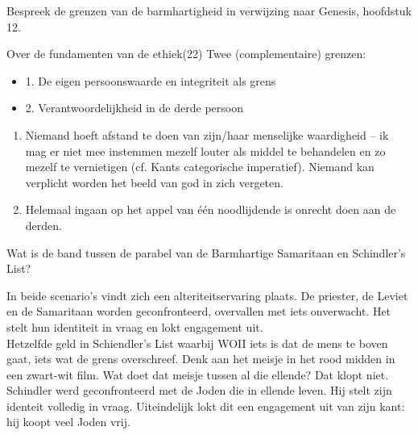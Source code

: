 \documentclass[main.tex]{subfiles}
\begin{document}
\begin{examenvraag}
    \begin{vraag}
        Bespreek de grenzen van de barmhartigheid in verwijzing naar Genesis, hoofdstuk 12.
    \end{vraag}

    \begin{antwoord}
        \begin{citaat}{Over de fundamenten van de ethiek(22)}
            Twee (complementaire) grenzen:
            \begin{itemize}
                \item 1. De eigen persoonswaarde en integriteit als grens
                \item 2. Verantwoordelijkheid in de derde persoon
            \end{itemize}
        \end{citaat}

		\begin{enumerate}
			\item Niemand hoeft afstand te doen van zijn/haar menselijke waardigheid – ik mag er niet
			        mee instemmen mezelf louter als middel te behandelen en zo mezelf te vernietigen (cf. Kants categorische imperatief).
			        Niemand kan verplicht worden het beeld van god in zich vergeten.
			\item Helemaal ingaan op het appel van \'{e}\'{e}n noodlijdende is onrecht doen aan de derden.
		\end{enumerate}


    \end{antwoord}
\end{examenvraag}


\begin{examenvraag}
    \begin{vraag}
        Wat is de band tussen de parabel van de Barmhartige Samaritaan en Schindler’s List?
    \end{vraag}

    \begin{antwoord}
		In beide scenario's vindt zich een alteriteitservaring plaats. De priester, de Leviet en de Samaritaan worden geconfronteerd, overvallen met iets onverwacht. Het stelt hun identiteit in vraag en lokt engagement uit.\\
		Hetzelfde geld in Schiendler's List waarbij WOII iets is dat de mens te boven gaat, iets wat de grens overschreef.
		Denk aan het meisje in het rood midden in een zwart-wit film. Wat doet dat meisje tussen al die ellende? Dat klopt niet. Schindler werd geconfronteerd met de Joden die in ellende leven. Hij stelt zijn identeit volledig in vraag. Uiteindelijk lokt dit een engagement uit van zijn kant: hij koopt veel Joden vrij.
    \end{antwoord}
\end{examenvraag}
\end{document}
